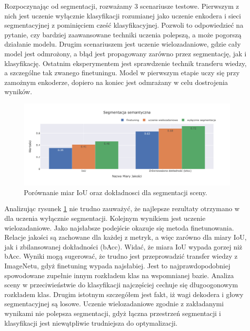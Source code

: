\vspace{0.5cm}
Rozpoczynając od segmentacji, rozważamy 3 scenariusze testowe. Pierwszym z nich jest uczenie wyłącznie klasyfikacji rozumianej jako uczenie enkodera i sieci segmentacyjnej z pominięciem cześć klasyfikacyjnej. Pozwoli to odpowiedzieć na pytanie, czy bardziej zaawansowane techniki uczenia polepszą, a może pogorszą działanie modelu. Drugim scenariuszem jest uczenie wielozadaniowe, gdzie cały model jest odmrożony, a błąd jest propagowany zarówno przez segmentację, jak i klasyfikację. Ostatnim eksperymentem jest sprawdzenie technik transferu wiedzy, a szczególne tak zwanego finetuningu. Model w pierwszym etapie uczy się przy zamożnym enkoderze, dopiero na koniec jest odmrażany w celu dostrojenia wyników.

\begin{figure}[ht!]
    \centering
    \includegraphics[width=\textwidth]{img/pl-res/Segmentacja-semantyczna.jpeg}
    \caption{Porównanie miar IoU oraz dokładnosci dla segmentacji sceny.}
    \label{fig:macro-segmentation}
\end{figure}

Analizując rysunek \ref{fig:macro-segmentation} nie trudno zauważyć, że najlepsze rezultaty otrzymano w dla uczenia wyłącznie segmentacji. Kolejnym wynikiem jest uczenie wielozadaniowe. Jako najsłabsze podejście okazuje się metoda finetunowania. Relacje jakości są zachowane dla każdej z metryk, a więc zarówno dla miary IoU, jak i zbilansowanej dokładności (bAcc). Widać, że miara IoU wypada gorzej niż bAcc. Wyniki mogą sugerować, że trudno jest przeprowadzić transfer wiedzy z ImageNetu, gdyż finetuning wypada najsłabiej. Jest to najprawdopodobniej spowodowane zupełnie innym rozkładem klas na wspomnianej bazie. Analiza sceny w przeciwieństwie do klasyfikacji najczęściej cechuje się długoogonowym rozkładem klas. Drugim istotnym szczegółem jest fakt, iż wagi dekodera i głowy segmentacyjnej są losowe. Uczenie wielozadaniowe zgodnie z zakładanymi wynikami nie polepsza segmentacji, gdyż łączna przestrzeń segmentacji i klasyfikacji jest niewątpliwie trudniejsza do optymalizacji.

